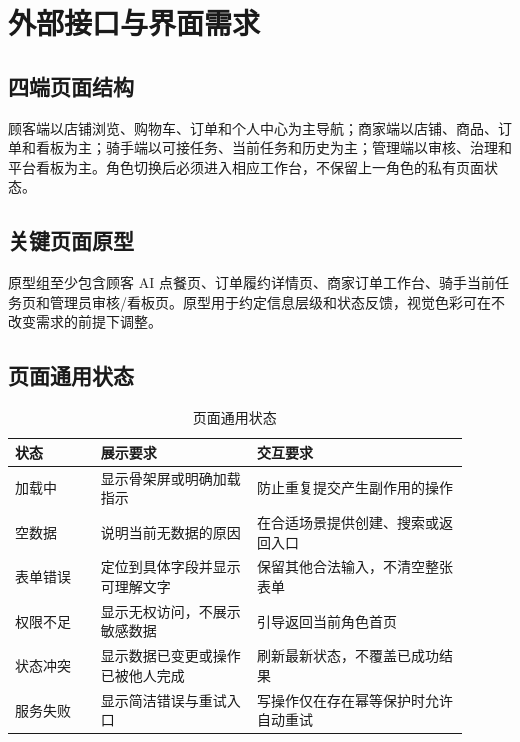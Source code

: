 \section{外部接口与界面需求}

\subsection{四端页面结构}


顾客端以店铺浏览、购物车、订单和个人中心为主导航；商家端以店铺、商品、订单和看板为主；骑手端以可接任务、当前任务和历史为主；管理端以审核、治理和平台看板为主。角色切换后必须进入相应工作台，不保留上一角色的私有页面状态。

\subsection{关键页面原型}


原型组至少包含顾客 AI 点餐页、订单履约详情页、商家订单工作台、骑手当前任务页和管理员审核/看板页。原型用于约定信息层级和状态反馈，视觉色彩可在不改变需求的前提下调整。

\subsection{页面通用状态}

\begin{longtable}{|L{0.17\linewidth}|L{0.31\linewidth}|L{0.42\linewidth}|}
\caption{页面通用状态}\label{tab:ui-state}\\ \hline
\textbf{状态} & \textbf{展示要求} & \textbf{交互要求} \\ \hline
加载中 & 显示骨架屏或明确加载指示 & 防止重复提交产生副作用的操作 \\ \hline
空数据 & 说明当前无数据的原因 & 在合适场景提供创建、搜索或返回入口 \\ \hline
表单错误 & 定位到具体字段并显示可理解文字 & 保留其他合法输入，不清空整张表单 \\ \hline
权限不足 & 显示无权访问，不展示敏感数据 & 引导返回当前角色首页 \\ \hline
状态冲突 & 显示数据已变更或操作已被他人完成 & 刷新最新状态，不覆盖已成功结果 \\ \hline
服务失败 & 显示简洁错误与重试入口 & 写操作仅在存在幂等保护时允许自动重试 \\ \hline
\end{longtable}

